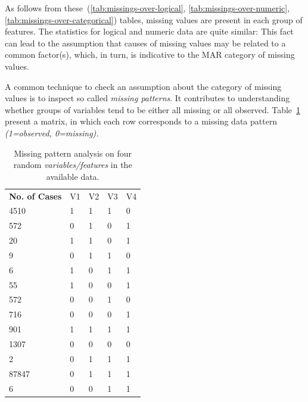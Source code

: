 As follows from these~(\ref{tab:missings-over-logical}, \ref{tab:missings-over-numeric}, \ref{tab:missings-over-categorical}) tables, missing values are present in each group of features. The statistics for logical and numeric data are quite similar: This fact can lead to the assumption that causes of missing values may be related to a common factor(s), which, in turn, is indicative to the MAR category of missing values.

A common technique to check an assumption about the category of missing values is to inspect so called \textit{missing patterns}. It contributes to understanding whether groups of variables tend to be either all missing or all observed. Table~\ref{tab:variable-pattern-example} present a matrix, in which each row corresponds to a missing data pattern \textit{(1=observed, 0=missing).} 

\begin{table}[h!]
\centering
\caption{Missing pattern analysis on four random \textit{variables/features} in the available data.}
\label{tab:variable-pattern-example}
\begin{tabular}{lllll}
\textbf{No. of Cases} & V1 & V2 & V3 & V4 \\
4510            & 1           & 1           & 1           & 0           \\
572             & 0           & 1           & 0           & 1           \\
20              & 1           & 1           & 0           & 1           \\
9               & 0           & 1           & 1           & 0           \\
6               & 1           & 0           & 1           & 1           \\
55              & 1           & 0           & 0           & 1           \\
572             & 0           & 0           & 1           & 0           \\
716             & 0           & 0           & 0           & 1           \\
901             & 1           & 1           & 1           & 1           \\
1307            & 0           & 0           & 0           & 0          \\
2               & 0           & 1           & 1           & 1           \\
87847           & 0           & 1           & 1           & 1           \\
6               & 0           & 0           & 1           & 1           \\
\end{tabular}
\end{table}

